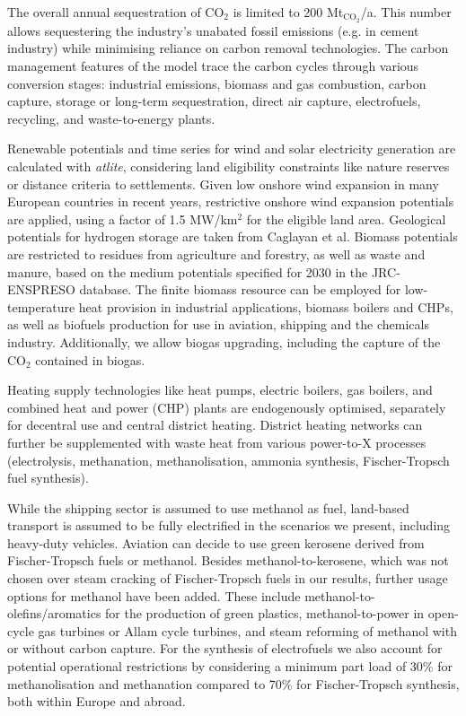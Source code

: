 The overall annual sequestration of CO$_2$ is limited to 200
Mt$_{\text{CO}_2}$/a. This number allows sequestering the industry's unabated
fossil emissions (e.g. in cement industry) while minimising reliance on carbon
removal technologies. The carbon management features of the model trace the
carbon cycles through various conversion stages: industrial emissions, biomass
and gas combustion, carbon capture, storage or long-term sequestration, direct
air capture, electrofuels, recycling, and waste-to-energy plants.

Renewable potentials and time series for wind and solar electricity generation
are calculated with \textit{atlite},\cite{hofmannAtliteLightweight2021}
considering land eligibility constraints like nature reserves or distance
criteria to settlements. Given low onshore wind expansion in many European
countries in recent years,\cite{ourworldindataInstalledWind2023} restrictive
onshore wind expansion potentials are applied, using a factor of 1.5 MW/km$^2$
for the eligible land area. Geological potentials for hydrogen storage are taken
from Caglayan et al.\cite{caglayanTechnicalPotential2020} Biomass potentials are
restricted to residues from agriculture and forestry, as well as waste and
manure, based on the medium potentials specified for 2030 in the JRC-ENSPRESO
database.\cite{ruizENSPRESOOpen2019} The finite biomass resource can be employed
for low-temperature heat provision in industrial applications, biomass boilers
and CHPs, as well as biofuels production for use in aviation, shipping and the
chemicals industry. Additionally, we allow biogas upgrading, including the
capture of the CO$_2$ contained in biogas.

Heating supply technologies like heat pumps, electric boilers, gas boilers, and
combined heat and power (CHP) plants are endogenously optimised, separately for
decentral use and central district heating. District heating networks can
further be supplemented with waste heat from various power-to-X processes
(electrolysis, methanation, methanolisation, ammonia synthesis, Fischer-Tropsch
fuel synthesis).

While the shipping sector is assumed to use methanol as fuel, land-based
transport is assumed to be fully electrified in the scenarios we present,
including heavy-duty vehicles. Aviation can decide to use green kerosene derived
from Fischer-Tropsch fuels or methanol. Besides methanol-to-kerosene, which was
not chosen over steam cracking of Fischer-Tropsch fuels in our results, further
usage options for methanol have been added. These include
methanol-to-olefins/aromatics for the production of green plastics,
methanol-to-power\cite{brownUltralongdurationEnergy2023} in open-cycle gas
turbines or Allam cycle turbines, and steam reforming of methanol with or
without carbon capture. For the synthesis of electrofuels we also account for
potential operational restrictions by considering a minimum part load of 30\%
for methanolisation and methanation compared to 70\% for Fischer-Tropsch
synthesis, both within Europe and abroad.

